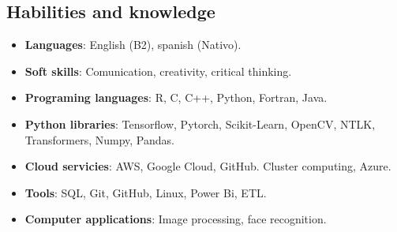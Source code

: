 \documentclass[a3paper]{adcv_color}
\begin{document}
\begin{minipage}{0.65\linewidth}
	\begin{addmargin}[0.5em]{0.5em}
		\section{Habilities and knowledge}

		\begin{itemize}
			\setlength\itemsep{0em}
			\item \textbf{Languages}: English (B2), spanish (Nativo).
			\item \textbf{Soft skills}:
				Comunication, creativity, critical thinking.
			\item \textbf{Programing languages}:
				R, C, C++, Python, Fortran, Java.
			\item \textbf{Python libraries}:
				Tensorflow, Pytorch, Scikit-Learn, OpenCV, NTLK, Transformers, Numpy, Pandas.
			\item \textbf{Cloud servicies}:
				AWS, Google Cloud, GitHub. Cluster computing, Azure.
			\item \textbf{Tools}:
				SQL, Git, GitHub, Linux, Power Bi, ETL.
			\item \textbf{Computer applications}:
				Image processing, face recognition.
		\end{itemize}
	\end{addmargin}
\end{minipage}
\end{document}
